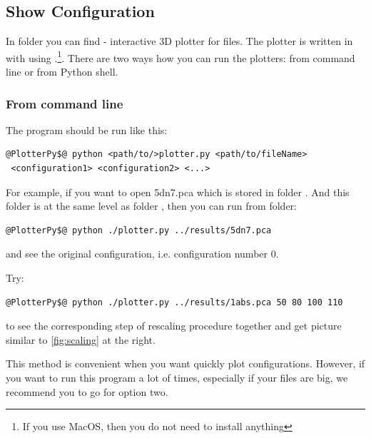 \documentclass[12pt]{article}
\begin{document}
\subsection{Show Configuration}
\begin{mySection}\label{sec:matlab}
In folder  you can find  - interactive 3D plotter for  files.
The plotter is written in  with using .\footnote{If you use MacOS, then you do not need to install anything}. There are two ways how you can run the plotters: from command line or from Python shell.
\subsubsection{From command line}
The program should be run like this:
\begin{lstlisting}
@PlotterPy$@ python <path/to/>plotter.py <path/to/fileName>
 <configuration1> <configuration2> <...>
\end{lstlisting}

For example, if you want to open 5dn7.pca which is stored in folder . And this folder  is at the same level as folder , then you can run from  folder:
\begin{lstlisting}
@PlotterPy$@ python ./plotter.py ../results/5dn7.pca
\end{lstlisting}
and see the original configuration, i.e. configuration number 0.

Try:
\begin{lstlisting}
@PlotterPy$@ python ./plotter.py ../results/1abs.pca 50 80 100 110
\end{lstlisting}
to see the corresponding step of rescaling procedure together and get picture similar to \ref{fig:scaling} at the right.

This method is convenient when you want quickly plot configurations. However, if you want to run this program a lot of times, especially if your files are big, we recommend you to go for option two.


\end{mySection}
\end{document}
